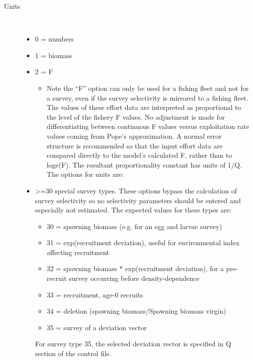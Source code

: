 \begin{description}
	\item[Units]\hfill\\	
	\begin{itemize}
		\item 0  = numbers
		\item 1  = biomass
		\item 2  = F
		\begin{itemize}
			\item 	Note the “F” option can only be used for a fishing fleet and not for a survey, even if the survey selectivity is mirrored to a fishing fleet.  The values of these effort data are interpreted as proportional to the level of the fishery F values.  No adjustment is made for differentiating between continuous F values versus exploitation rate values coming from Pope’s approximation.  A normal error structure is recommended so that the input effort data are compared directly to the model’s calculated F, rather than to loge(F).  The resultant proportionality constant has units of 1/Q. The options for units are:	
		\end{itemize}
		\item >=30 special survey types.  These options bypass the calculation of survey selectivity so no selectivity parameters should be entered and especially not estimated.  The expected values for these types are:
		\begin{itemize}
			\item 30 = spawning biomass (e.g. for an egg and larvae survey)
			\item 31 = exp(recruitment deviation), useful for environmental index affecting recruitment
			\item 32 = spawning biomass * exp(recruitment deviation), for a pre-recruit survey occurring before density-dependence
			\item 33 = recruitment, age-0 recruits
			\item 34 = deletion (spawning biomass/Spawning biomass virgin)
			\item 35 = survey of a deviation vector
		\end{itemize}
	    For survey type 35, the selected deviation vector is specified in Q section of the control file.
	\end{itemize}
	

\end{description}
